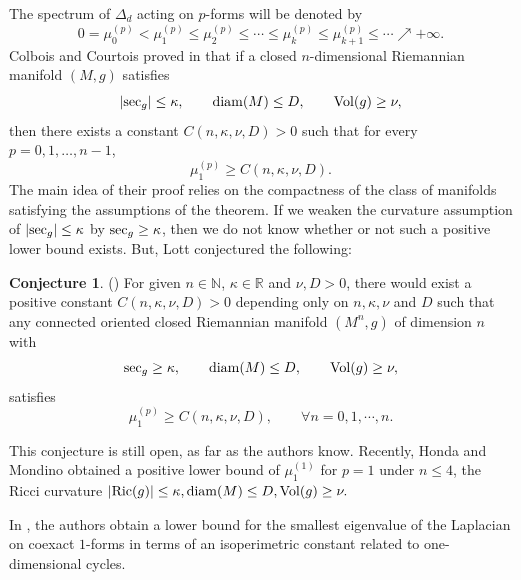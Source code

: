 \documentclass[12pt, twoside]{article}
\theoremstyle{definition}
\numberwithin{equation}{section}
\newtheorem*{conjecture}{Conjecture}
\begin{document}
The spectrum of $\Delta_d$ acting on $p$-forms will be denoted by
\[
0 = \mu^{(p)}_0 < \mu^{(p)}_1 \le \mu^{(p)}_2 \le \cdots \le \mu^{(p)}_k \le \mu^{(p)}_{k+1} \le \cdots \nearrow +\infty .
\]
Colbois and Courtois proved in \cite[Theorem 0.4]{Colbois1990} that if a closed $n$-dimensional Riemannian manifold $(M,g)$ satisfies
\[
|{\rm sec}_g| \le \kappa, \qquad {\rm diam}(M) \le D, \qquad {\rm Vol}(g) \ge \nu,
\]
then there exists a constant $C(n,\kappa,\nu,D) > 0$ such that for every $p=0,1, \dots, n-1$,
\[
\mu^{(p)}_1 \ge C(n,\kappa,\nu,D).
\]
The main idea of their proof relies on the compactness of the class of manifolds satisfying the assumptions of the theorem.  If we weaken the curvature assumption of $|{\rm sec}_g| \le \kappa$ by ${\rm sec}_g\ge \kappa$, then we do not know
whether or not such a positive lower bound exists. But, Lott  conjectured the
following:
\begin{conjecture} (\cite[Lott]{Lott2004})
For given $n\in\mathbb{N}$, $\kappa\in\mathbb{R}$ and $\nu, D>0$, there would exist
a positive constant $C(n,\kappa,\nu,D)>0$ depending only on $n,\kappa,\nu$ and $D$ such that any
connected oriented closed Riemannian manifold $(M^{n},g)$ of dimension $n$ with 
\[
{\rm sec}_g \ge \kappa, \qquad {\rm diam}(M) \le D, \qquad {\rm Vol}(g) \ge \nu,
\]
satisfies
\[
\mu^{(p)}_1 \ge C(n,\kappa,\nu,D),\qquad \forall n=0,1,\cdots,n.
\]
\end{conjecture}
This conjecture is still open, as far as the authors know. Recently, Honda and Mondino \cite{Honda2025} obtained a positive lower bound of $\mu^{(1)}_{1}$ for $p= 1$ under $n\le4$, the Ricci
curvature $|{\rm Ric}(g)| \le \kappa, {\rm diam}(M) \le D, {\rm Vol}(g) \ge \nu.$
 

In \cite{Boulanger2022}, the authors obtain a lower bound for the smallest eigenvalue of the Laplacian on coexact $1$-forms in terms of an isoperimetric constant related to one-dimensional cycles. 
\end{document}
